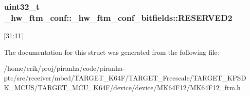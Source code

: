 \subsubsection[{\texorpdfstring{R\+E\+S\+E\+R\+V\+E\+D2}{RESERVED2}}]{\setlength{\rightskip}{0pt plus 5cm}uint32\+\_\+t \+\_\+hw\+\_\+ftm\+\_\+conf\+::\+\_\+hw\+\_\+ftm\+\_\+conf\+\_\+bitfields\+::\+R\+E\+S\+E\+R\+V\+E\+D2}\hypertarget{struct__hw__ftm__conf_1_1__hw__ftm__conf__bitfields_ae057e03cb895a25df19e95d8c13f9ed2}{}\label{struct__hw__ftm__conf_1_1__hw__ftm__conf__bitfields_ae057e03cb895a25df19e95d8c13f9ed2}
\mbox{[}31\+:11\mbox{]} 

The documentation for this struct was generated from the following file\+:\begin{DoxyCompactItemize}
\item 
/home/erik/proj/piranha/code/piranha-\/ptc/src/receiver/mbed/\+T\+A\+R\+G\+E\+T\+\_\+\+K64\+F/\+T\+A\+R\+G\+E\+T\+\_\+\+Freescale/\+T\+A\+R\+G\+E\+T\+\_\+\+K\+P\+S\+D\+K\+\_\+\+M\+C\+U\+S/\+T\+A\+R\+G\+E\+T\+\_\+\+M\+C\+U\+\_\+\+K64\+F/device/device/\+M\+K64\+F12/M\+K64\+F12\+\_\+ftm.\+h\end{DoxyCompactItemize}
